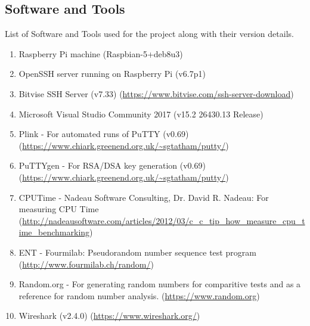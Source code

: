 \documentclass{bhamthesis}
\begin{document}
\begin{appendices}
\chapter{Software and Tools}
List of Software and Tools used for the project along with their version details.
\begin{enumerate}
    \item Raspberry Pi machine (Raspbian-5+deb8u3)
    \item OpenSSH server running on Raspberry Pi (v6.7p1)
    \item Bitvise SSH Server (v7.33)
    (\url{https://www.bitvise.com/ssh-server-download})
    \item Microsoft Visual Studio Community 2017 (v15.2 26430.13 Release)
    \item Plink - For automated runs of PuTTY (v0.69) (\url{https://www.chiark.greenend.org.uk/~sgtatham/putty/})
    \item PuTTYgen - For RSA/DSA key generation (v0.69) (\url{https://www.chiark.greenend.org.uk/~sgtatham/putty/})
    \item CPUTime - Nadeau Software Consulting, Dr. David R. Nadeau: For measuring CPU Time (\url{http://nadeausoftware.com/articles/2012/03/c_c_tip_how_measure_cpu_time_benchmarking})
    \item ENT - Fourmilab: Pseudorandom number sequence test program (\url{http://www.fourmilab.ch/random/})
     \item Random.org - For generating random numbers for comparitive tests and as a reference for random number analysis. (\url{https://www.random.org})
    \item Wireshark (v2.4.0) (\url{https://www.wireshark.org/})
\end{enumerate}
\end{appendices}
\end{document}
